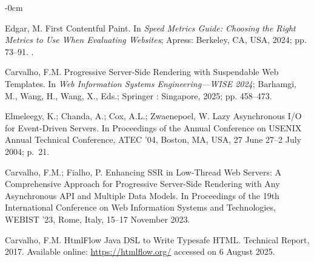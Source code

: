 \documentclass[software,article,accept,pdftex,moreauthors]{Definitions/mdpi}
\begin{document}
\begin{adjustwidth}{-\extralength}{0cm}



\begin{thebibliography}{999}

Edgar, M. First Contentful Paint.
\newblock In {\em Speed Metrics Guide: Choosing the Right Metrics to Use When
  Evaluating Websites}; Apress: Berkeley, CA, USA, 2024; pp. 73--91.
.

Carvalho, F.M.
\newblock Progressive Server-Side Rendering with Suspendable Web Templates.
\newblock In \emph{Web Information Systems Engineering---WISE
  2024}; Barhamgi, M., Wang, H., Wang, X., Eds.; Springer%
: Singapore,  2025; pp. 458--473.

Elmeleegy, K.; Chanda, A.; Cox, A.L.; Zwaenepoel, W.
\newblock Lazy Asynchronous I/O for Event-Driven Servers.
\newblock In Proceedings of the Annual Conference on USENIX
  Annual Technical Conference, ATEC '04, Boston, MA, USA, 27 June 27--2 July 2004; p.~21.

Carvalho, F.M.; Fialho, P.
\newblock Enhancing SSR in Low-Thread Web Servers: A Comprehensive Approach for
  Progressive Server-Side Rendering with Any Asynchronous API and Multiple Data
  Models.
\newblock In Proceedings of the 19th International
  Conference on Web Information Systems and Technologies, WEBIST '23, Rome, Italy, 15--17 November  2023.


Carvalho, F.M.
\newblock HtmlFlow Java DSL to Write Typesafe HTML.
\newblock Technical Report, 2017. Available online: \url{https://htmlflow.org/} accessed on 6 August 2025. %



\end{thebibliography}
\end{adjustwidth}
\end{document}
